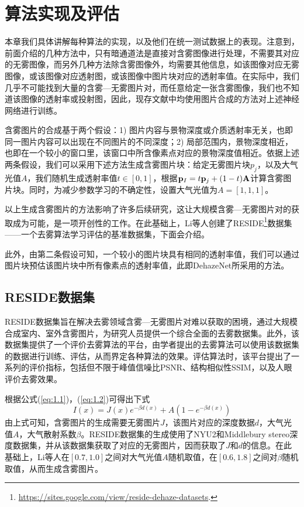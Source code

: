 \documentclass[a4paper, 12pt, oneside]{report}
\begin{document}
{\chapter{算法实现及评估\quad}

本章我们具体讲解每种算法的实现，以及他们在统一测试数据上的表现。注意到，前面介绍的几种方法中，只有暗通道法是直接对含雾图像进行处理，不需要其对应的无雾图像，而另外几种方法除含雾图像外，均需要其他信息，如该图像对应无雾图像，或该图像对应透射图，或该图像中图片块对应的透射率值。在实际中，我们几乎不可能找到大量的含雾—无雾图片对，而任意给定一张含雾图像，我们也不知道该图像的透射率或投射图，因此，现存文献中均使用图片合成的方法对上述神经网络进行训练。

含雾图片的合成基于两个假设\cite{ref20}：1) 图片内容与景物深度或介质透射率无关，也即同一图片内容可以出现在不同图片的不同深度；2) 局部范围内，景物深度相近，也即在一个较小的窗口里，该窗口中所含像素点对应的景物深度值相近。依据上述两条假设，我们可以采用下述方法生成含雾图片块：给定无雾图片块\textbf{$p_j$}，以及大气光值$A$，我们随机生成透射率值$t\in [0,1]$，根据${\bf p}_I = t{\bf p}_j + (1 - t){\bf A}$计算含雾图片块。同时，为减少参数学习的不确定性，设置大气光值为$A = [1,1,1]$。

以上生成含雾图片的方法影响了许多后续研究，这让大规模含雾—无雾图片对的获取成为可能，是一项开创性的工作。在此基础上，Li\cite{ref21}等人创建了RESIDE\footnote{\url{https://sites.google.com/view/reside-dehaze-datasets}.}数据集——一个去雾算法学习评估的基准数据集，下面会介绍。

此外，由第二条假设可知，一个较小的图片块具有相同的透射率值，我们可以通过图片块预估该图片块中所有像素点的透射率值，此即DehazeNet所采用的方法。

\section{RESIDE数据集\quad}
RESIDE数据集旨在解决去雾领域含雾—无雾图片对难以获取的困境，通过大规模合成室内、室外含雾图片，为研究人员提供一个综合全面的去雾数据集。此外，该数据集提供了一个评价去雾算法的平台，由学者提出的去雾算法可以使用该数据集的数据进行训练、评估，从而界定各种算法的效果。评估算法时，该平台提出了一系列的评价指标，包括但不限于峰值信噪比PSNR、结构相似性SSIM，以及人眼评价去雾效果。

根据公式(\ref{eq:1.1})，(\ref{eq:1.2})可得出下式
\begin{equation}\label{eq:4.1}
I(x) = J(x) e^{-\beta d(x)} + A(1 - e^{-\beta d(x)})
\end{equation}
由上式可知，含雾图片的生成需要无雾图片$J$，该图片对应的深度数据$d$，大气光值$A$，大气散射系数$\beta$。RESIDE数据集的生成使用了NYU2\cite{ref22}和Middlebury stereo\cite{ref23}深度数据集，并从该数据集获取了对应的无雾图片，因而获取了$J$和$d$的信息。在此基础上，Li等人在$[0.7, 1.0]$之间对大气光值$A$随机取值，在$[0.6, 1.8]$之间对$\beta$随机取值，从而生成含雾图片。

}
\end{document}
